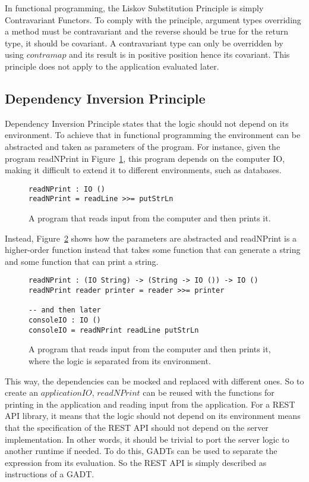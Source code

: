 In functional programming, the Liskov Substitution Principle is simply
Contravariant Functors.  To comply with the principle, argument types overriding
a method must be contravariant and the reverse should be true for the return
type, it should be covariant.  A contravariant type can only be overridden by
using $contramap$ and its result is in positive position hence its covariant.
This principle does not apply to the application evaluated later.

\subsection{Dependency Inversion Principle} 

Dependency Inversion Principle states that the logic should not depend on its
environment. To achieve that in functional programming the environment can
be abstracted and taken as parameters of the program. For instance, given the
program readNPrint in Figure~\ref{diexample}, this program depends on the
computer IO, making it difficult to extend it to different environments, such as
databases. 

\begin{figure}[H]
    \begin{lstlisting}
readNPrint : IO () 
readNPrint = readLine >>= putStrLn
    \end{lstlisting}
    \caption{A program that reads input from the computer and then prints it.}
    \label{diexample}
\end{figure}

Instead, Figure~\ref{withdiexample} shows how the parameters are abstracted and
readNPrint is a higher-order function instead that takes some function that
can generate a string and some function that can print a string.


\begin{figure}[H]
    \begin{lstlisting}
readNPrint : (IO String) -> (String -> IO ()) -> IO ()
readNPrint reader printer = reader >>= printer

-- and then later
consoleIO : IO ()
consoleIO = readNPrint readLine putStrLn
    \end{lstlisting}
    \caption{A program that reads input from the computer and then prints it,
    where the logic is separated from its environment.}
    \label{withdiexample}
\end{figure}

This way, the dependencies can be mocked and replaced with different ones. So 
 to create an $applicationIO$,  $readNPrint$ can be reused with the
functions for printing in the application and reading input from the
application.  For a REST API library, it means that the logic should not depend
on its environment means that the specification of the REST API should not
depend on the server implementation. In other words, it should be trivial to
port the server logic to another runtime if needed. To do this, GADTs can be
used to separate the expression from its evaluation. So the REST API is simply
described as instructions of a GADT. 

